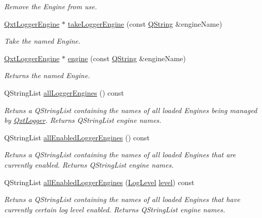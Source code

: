 \begin{DoxyCompactItemize}
\begin{DoxyCompactList}\small\item\em Remove the Engine from use. \end{DoxyCompactList}\item 
\hyperlink{class_qxt_logger_engine}{Qxt\-Logger\-Engine} $\ast$ \hyperlink{class_qxt_logger_a6d4edb3ef4e43e2d06af8f7286f0ee55}{take\-Logger\-Engine} (const \hyperlink{group___u_a_v_objects_plugin_gab9d252f49c333c94a72f97ce3105a32d}{Q\-String} \&engine\-Name)
\begin{DoxyCompactList}\small\item\em Take the named Engine. \end{DoxyCompactList}\item 
\hyperlink{class_qxt_logger_engine}{Qxt\-Logger\-Engine} $\ast$ \hyperlink{class_qxt_logger_add68d45798d759b9b96824e1f6b86967}{engine} (const \hyperlink{group___u_a_v_objects_plugin_gab9d252f49c333c94a72f97ce3105a32d}{Q\-String} \&engine\-Name)
\begin{DoxyCompactList}\small\item\em Returns the named Engine. \end{DoxyCompactList}\item 
Q\-String\-List \hyperlink{class_qxt_logger_aca0a902d6704bcc7628cba8fc961427c}{all\-Logger\-Engines} () const 
\begin{DoxyCompactList}\small\item\em Retuns a Q\-String\-List containing the names of all loaded Engines being managed by \hyperlink{class_qxt_logger}{Qxt\-Logger}. Returns Q\-String\-List engine names. \end{DoxyCompactList}\item 
Q\-String\-List \hyperlink{class_qxt_logger_a50904e6730399d5acc894f020baf1b45}{all\-Enabled\-Logger\-Engines} () const 
\begin{DoxyCompactList}\small\item\em Retuns a Q\-String\-List containing the names of all loaded Engines that are currently enabled. Returns Q\-String\-List engine names. \end{DoxyCompactList}\item 
Q\-String\-List \hyperlink{class_qxt_logger_ad51599c63821adaabdf6d19570e26ac7}{all\-Enabled\-Logger\-Engines} (\hyperlink{class_qxt_logger_ac2071072628aa786466124cc32a324e7}{Log\-Level} \hyperlink{glext_8h_abc60a79088789bd61297bf5f9ff500d1}{level}) const 
\begin{DoxyCompactList}\small\item\em Retuns a Q\-String\-List containing the names of all loaded Engines that have currently certain log level enabled. Returns Q\-String\-List engine names. \end{DoxyCompactList}\item 

\end{DoxyCompactItemize}
